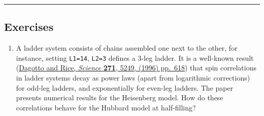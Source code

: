 \documentclass[11pt]{article}
\providecommand{\tightlist}{%
      \setlength{\itemsep}{0pt}\setlength{\parskip}{0pt}}
\begin{document}
    \begin{center}\rule{0.5\linewidth}{0.5pt}\end{center}

\hypertarget{exercises}{%
\subsection{Exercises}\label{exercises}}

\begin{enumerate}
\def\labelenumi{\arabic{enumi}.}
\tightlist
\item
  A ladder system consists of chains assembled one next to the other,
  for instance, setting \texttt{L1=14}, \texttt{L2=3} defines a 3-leg
  ladder. It is a well-known result
  (\href{https://doi.org/10.1126/science.271.5249.618}{Dagotto and Rice,
  \emph{Science} \textbf{271}, 5249, (1996) pp.~618}) that spin
  correlations in ladder systems decay as power laws (apart from
  logarithmic corrections) for odd-leg ladders, and exponentially for
  even-leg ladders. The paper presents numerical results for the
  Heisenberg model. How do these correlations behave for the Hubbard
  model at half-filling?
\end{enumerate}


    
    
    
\end{document}
